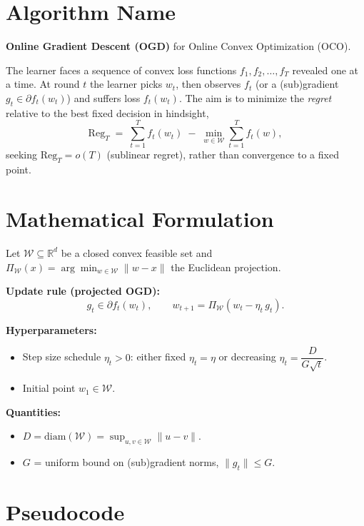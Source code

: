 \documentclass[11pt]{article}
\begin{document}
\section*{Algorithm Name}
\textbf{Online Gradient Descent (OGD)} for Online Convex Optimization (OCO).

The learner faces a sequence of convex loss functions $f_1, f_2, \ldots, f_T$ revealed
one at a time. At round $t$ the learner picks $w_t$, then observes $f_t$ (or a
(sub)gradient $g_t \in \partial f_t(w_t)$) and suffers loss $f_t(w_t)$. The aim is to
minimize the \emph{regret} relative to the best fixed decision in hindsight,
\[
\mathrm{Reg}_T \;=\; \sum_{t=1}^{T} f_t(w_t) \;-\; \min_{w \in \mathcal{W}} \sum_{t=1}^{T} f_t(w),
\]
seeking $\mathrm{Reg}_T = o(T)$ (sublinear regret), rather than convergence to a fixed point.

\section*{Mathematical Formulation}

Let $\mathcal{W} \subseteq \mathbb{R}^d$ be a closed convex feasible set and
$\Pi_{\mathcal{W}}(x) = \arg\min_{w\in\mathcal{W}} \|w - x\|$ the Euclidean projection.

\textbf{Update rule (projected OGD):}
\[
g_t \in \partial f_t(w_t), \qquad
w_{t+1} = \Pi_{\mathcal{W}}\!\left( w_t - \eta_t\, g_t \right).
\]

\textbf{Hyperparameters:}
\begin{itemize}
  \item Step size schedule $\eta_t > 0$: either fixed $\eta_t = \eta$
        or decreasing $\eta_t = \dfrac{D}{G\sqrt{t}}$.
  \item Initial point $w_1 \in \mathcal{W}$.
\end{itemize}

\textbf{Quantities:}
\begin{itemize}
  \item $D = \mathrm{diam}(\mathcal{W}) = \sup_{u,v\in\mathcal{W}} \|u-v\|$.
  \item $G$ = uniform bound on (sub)gradient norms, $\|g_t\| \le G$.
\end{itemize}

\section*{Pseudocode}
\end{document}
